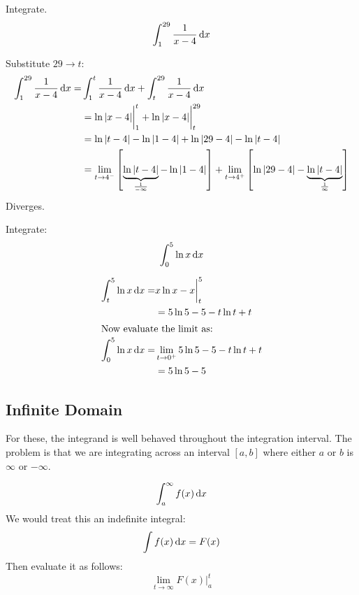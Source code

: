 \begin{ex}
  Integrate.
  \[ \int^{29}_1 \frac{1}{x-4} \,\mathrm{d} x \]
  \begin{sol}
    Substitute $29 \to t$:
    \begin{align*}
      \int^{29}_1 \frac{1}{x-4} \,\mathrm{d} x =& \int^t_1 \frac{1}{x-4} \,\mathrm{d} x
      + \int^{29}_t \frac{1}{x-4} \,\mathrm{d} x \\
      &= \ln{|x-4|}\bigg|^t_1 + \ln{|x-4|} \bigg|^{29}_t \\
      &=\ln{|t-4|}-\ln{|1-4|}+\ln{|29-4|}-\ln{|t-4|} \\
      &=\lim_{t \to 4^-} \left[\underbrace{\ln{|t-4|}}_{\frac{1}{-\infty}}-\ln{|1-4|}\right]+\lim_{t \to 4^+} \left[\ln{|29-4|}-\underbrace{\ln{|t-4|}}_{\frac{1}{\infty}}\right]
    \end{align*}
    Diverges.
  \end{sol}
\end{ex}
\begin{ex}
  Integrate:
  \[ \int^5_0 \ln{x} \,\mathrm{d} x \]
  \begin{sol}
  \begin{align*}
    \int^5_t \ln{x} \,\mathrm{d} x =&x \ln{x} -x \bigg|^5_t \\
    &=5 \ln{5} -5-t\ln{t}+t \\
    \intertext{Now evaluate the limit as:}
    \int^5_0 \ln{x} \,\mathrm{d} x =& \lim_{t \to 0^+}5 \ln{5} -5-t\ln{t}+t \\
    &=5 \ln 5 - 5
  \end{align*}
\end{sol}
\end{ex}

%
%

\subsection{Infinite Domain}

For these, the integrand is well behaved throughout the integration interval. The problem is that we are integrating across an interval $[a, b]$ where either $a$ or $b$ is $\infty$ or $-\infty$.

\begin{equation}
  \int^{\infty}_{a} f(x) \,\mathrm{d} x
\end{equation}
We would treat this an indefinite integral:
\[ \int f(x) \,\mathrm{d} x = F(x) \]
Then evaluate it as follows:
\[ \lim_{t \to \infty} F(x)\bigg|^{t}_{a} \] \\

